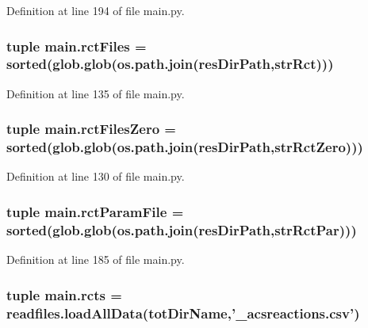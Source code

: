 Definition at line 194 of file main.\+py.

\hypertarget{a00153_a9016a8f5eafe76e4e8dbb1bc3ce94af5}{
\subsubsection[{rct\+Files}]{\setlength{\rightskip}{0pt plus 5cm}tuple main.\+rct\+Files = sorted(glob.\+glob(os.\+path.\+join({\bf res\+Dir\+Path},{\bf str\+Rct})))}}\label{a00153_a9016a8f5eafe76e4e8dbb1bc3ce94af5}


Definition at line 135 of file main.\+py.

\hypertarget{a00153_aa37eddd86a00bf98dff8cc9260d6d13b}{
\subsubsection[{rct\+Files\+Zero}]{\setlength{\rightskip}{0pt plus 5cm}tuple main.\+rct\+Files\+Zero = sorted(glob.\+glob(os.\+path.\+join({\bf res\+Dir\+Path},{\bf str\+Rct\+Zero})))}}\label{a00153_aa37eddd86a00bf98dff8cc9260d6d13b}


Definition at line 130 of file main.\+py.

\hypertarget{a00153_ac4e9cba2fd0b813ba19029541ad609e5}{
\subsubsection[{rct\+Param\+File}]{\setlength{\rightskip}{0pt plus 5cm}tuple main.\+rct\+Param\+File = sorted(glob.\+glob(os.\+path.\+join({\bf res\+Dir\+Path},{\bf str\+Rct\+Par})))}}\label{a00153_ac4e9cba2fd0b813ba19029541ad609e5}


Definition at line 185 of file main.\+py.

\hypertarget{a00153_ac2fe1ed3228b8e616f25ccfbe4cc7dc4}{
\subsubsection[{rcts}]{\setlength{\rightskip}{0pt plus 5cm}tuple main.\+rcts = readfiles.\+load\+All\+Data({\bf tot\+Dir\+Name},'\+\_\+acsreactions.\+csv')}}\label{a00153_ac2fe1ed3228b8e616f25ccfbe4cc7dc4}


